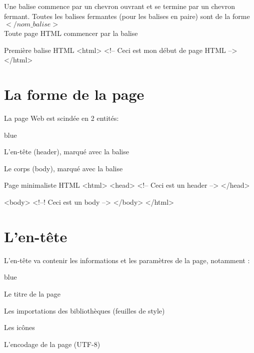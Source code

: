 {Une balise commence par un chevron ouvrant et se termine par un chevron fermant.
Toutes les balises fermantes (pour les balises en paire) sont de la forme $</nom\_balise>$ \\

Toute page HTML commencer par la balise 



\begin{Html}{Première balise HTML}
<html>
    <!-- Ceci est mon début de page HTML --> 
</html>
\end{Html}

\section{La forme de la page}

La page Web est scindée en 2 entités: 

\begin{items}{blue}{\Triangle}
\item L'en-tête (header), marqué avec la balise 
\item Le corps (body), marqué avec la balise 
\end{items}

\begin{Html}{Page minimaliste HTML}
<html>
    <head>
        <!-- Ceci est un header --> 
    </head>

    <body>
        <!--! Ceci est un body -->
    </body>
</html>
\end{Html}


\section{L'en-tête}

L'en-tête va contenir les informations et les paramètres de la page, notamment : 

\begin{items}{blue}{\Triangle}
    \item Le titre de la page
    \item Les importations des bibliothèques (feuilles de style)
    \item Les icônes
    \item L'encodage de la page (UTF-8)
    \end{items}


}
